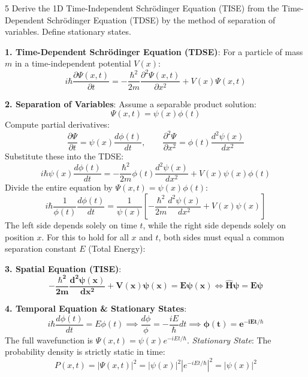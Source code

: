 \begin{theoryq}{5}
Derive the 1D Time-Independent Schrödinger Equation (TISE) from the Time-Dependent Schrödinger Equation (TDSE) by the method of separation of variables. Define stationary states.
\end{theoryq}
\begin{theorysol}
\textbf{1. Time-Dependent Schrödinger Equation (TDSE)}:
For a particle of mass $m$ in a time-independent potential $V(x)$:
\begin{equation}
i\hbar \frac{\partial \Psi(x,t)}{\partial t} = -\frac{\hbar^2}{2m}\frac{\partial^2 \Psi(x,t)}{\partial x^2} + V(x)\Psi(x,t)
\end{equation}

\textbf{2. Separation of Variables}:
Assume a separable product solution:
\begin{equation}
\Psi(x,t) = \psi(x) \phi(t)
\end{equation}
Compute partial derivatives:
\begin{equation}
\frac{\partial \Psi}{\partial t} = \psi(x)\frac{d\phi(t)}{dt}, \qquad \frac{\partial^2 \Psi}{\partial x^2} = \phi(t)\frac{d^2\psi(x)}{dx^2}
\end{equation}
Substitute these into the TDSE:
\begin{equation}
i\hbar \psi(x)\frac{d\phi(t)}{dt} = -\frac{\hbar^2}{2m}\phi(t)\frac{d^2\psi(x)}{dx^2} + V(x)\psi(x)\phi(t)
\end{equation}
Divide the entire equation by $\Psi(x,t) = \psi(x)\phi(t)$:
\begin{equation}
i\hbar \frac{1}{\phi(t)}\frac{d\phi(t)}{dt} = \frac{1}{\psi(x)}\left[ -\frac{\hbar^2}{2m}\frac{d^2\psi(x)}{dx^2} + V(x)\psi(x) \right]
\end{equation}
The left side depends solely on time $t$, while the right side depends solely on position $x$. For this to hold for all $x$ and $t$, both sides must equal a common separation constant $E$ (Total Energy):

\textbf{3. Spatial Equation (TISE)}:
\begin{equation}
\mathbf{-\frac{\hbar^2}{2m}\frac{d^2\psi(x)}{dx^2} + V(x)\psi(x) = E\psi(x) \iff \hat{H}\psi = E\psi}
\end{equation}

\textbf{4. Temporal Equation \& Stationary States}:
\begin{equation}
i\hbar \frac{d\phi(t)}{dt} = E\phi(t) \implies \frac{d\phi}{\phi} = -\frac{i E}{\hbar}dt \implies \mathbf{\phi(t) = e^{-i E t/\hbar}}
\end{equation}
The full wavefunction is $\Psi(x,t) = \psi(x)e^{-iEt/\hbar}$.
\textit{Stationary State}: The probability density is strictly static in time:
\begin{equation}
P(x,t) = |\Psi(x,t)|^2 = |\psi(x)|^2 |e^{-iEt/\hbar}|^2 = |\psi(x)|^2
\end{equation}
\end{theorysol}
\vspace{4mm}


